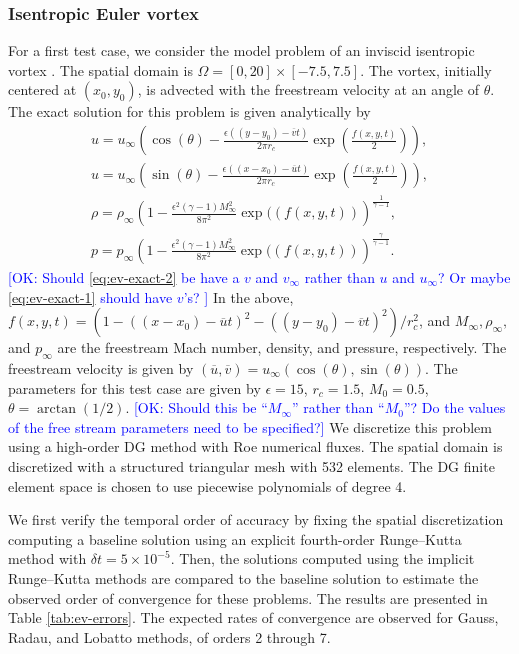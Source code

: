 \documentclass[review]{siamart}
\newcommand{\OK}[1]{\textcolor{blue}{[OK: #1]}}
\begin{document}
\subsubsection{Isentropic Euler vortex}
For a first test case, we consider the model problem of an inviscid isentropic
vortex \cite{Shu1998,Wang2013}. The spatial domain is $\Omega = [0,20] \times
[-7.5,7.5]$. The vortex, initially centered at $(x_0, y_0)$, is advected with
the freestream velocity at an angle of $\theta$. The exact solution for this
problem is given analytically by
\begin{gather}
\label{eq:ev-exact-1}
   u = u_\infty \left( \cos(\theta) - \frac{\epsilon ((y-y_0)
       - \overline{v} t)}{2\pi r_c}
       \exp\left( \frac{f(x,y,t)}{2} \right) \right),\\
\label{eq:ev-exact-2}
   u = u_\infty \left( \sin(\theta) - \frac{\epsilon ((x-x_0)
       - \overline{u} t)}{2\pi r_c}
       \exp\left( \frac{f(x,y,t)}{2} \right) \right),\\
\label{eq:ev-exact-3}
   \rho = \rho_\infty \left( 1 -
       \frac{\epsilon^2 (\gamma - 1)M^2_\infty}{8\pi^2} \exp((f(x,y,t))
       \right)^{\frac{1}{\gamma-1}}, \\
\label{eq:ev-exact-4}
   p = p_\infty \left( 1 -
       \frac{\epsilon^2 (\gamma - 1)M^2_\infty}{8\pi^2} \exp((f(x,y,t))
       \right)^{\frac{\gamma}{\gamma-1}}.
\end{gather}
%
\OK{
Should \eqref{eq:ev-exact-2} be have a $v$ and $v_{\infty}$ rather than $u$ and $u_{\infty}$? Or maybe \eqref{eq:ev-exact-1} should have $v$'s?
}
%
In the above, $f(x,y,t) = (1 - ((x-x_0) - \overline{u}t)^2 - ((y-y_0) - \overline{v}t)^2)/r_c^2$, and $M_\infty, \rho_\infty,$ and $p_\infty$ are the freestream Mach number, density, and pressure, respectively.
The freestream velocity is given by $(\overline{u},\overline{v}) = u_\infty (\cos(\theta), \sin(\theta))$.
The parameters for this test case are given by $\epsilon = 15$, $r_c = 1.5$, $M_0 = 0.5$, $\theta = \arctan(1/2)$. 
%
\OK{Should this be ``$M_{\infty}$'' rather than ``$M_0$''? Do the values of the free stream parameters need to be specified?}
%
We discretize this problem using a high-order DG method with Roe numerical fluxes.
The spatial domain is discretized with a structured triangular mesh with 532 elements.
The DG finite element space is chosen to use piecewise polynomials of degree 4.

We first verify the temporal order of accuracy by fixing the spatial discretization  computing a baseline solution using an explicit fourth-order Runge--Kutta method with $\delta t = 5\times 10^{-5}$.
Then, the solutions computed using the implicit Runge--Kutta methods are compared to the baseline solution to estimate the observed order of convergence for these problems.
The results are presented in Table \ref{tab:ev-errors}.
The expected rates of convergence are observed for Gauss, Radau, and Lobatto methods, of orders 2 through 7.
\end{document}
